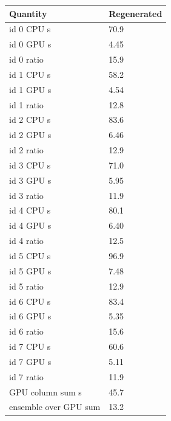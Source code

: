 \begin{tabular}{ll}
Quantity & Regenerated \\
\hline
id 0 CPU s & 70.9 \\
id 0 GPU s & 4.45 \\
id 0 ratio & 15.9 \\
id 1 CPU s & 58.2 \\
id 1 GPU s & 4.54 \\
id 1 ratio & 12.8 \\
id 2 CPU s & 83.6 \\
id 2 GPU s & 6.46 \\
id 2 ratio & 12.9 \\
id 3 CPU s & 71.0 \\
id 3 GPU s & 5.95 \\
id 3 ratio & 11.9 \\
id 4 CPU s & 80.1 \\
id 4 GPU s & 6.40 \\
id 4 ratio & 12.5 \\
id 5 CPU s & 96.9 \\
id 5 GPU s & 7.48 \\
id 5 ratio & 12.9 \\
id 6 CPU s & 83.4 \\
id 6 GPU s & 5.35 \\
id 6 ratio & 15.6 \\
id 7 CPU s & 60.6 \\
id 7 GPU s & 5.11 \\
id 7 ratio & 11.9 \\
GPU column sum s & 45.7 \\
ensemble over GPU sum & 13.2 \\
\end{tabular}
